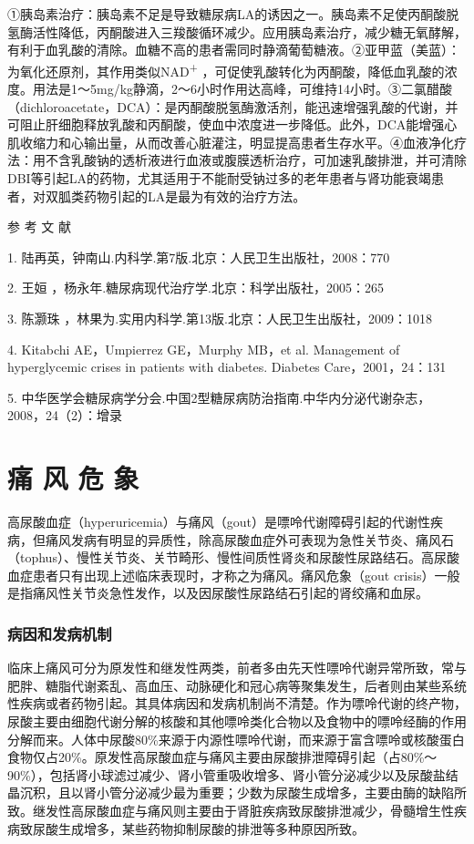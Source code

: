 ①胰岛素治疗：胰岛素不足是导致糖尿病LA的诱因之一。胰岛素不足使丙酮酸脱氢酶活性降低，丙酮酸进入三羧酸循环减少。应用胰岛素治疗，减少糖无氧酵解，有利于血乳酸的清除。血糖不高的患者需同时静滴葡萄糖液。②亚甲蓝（美蓝）：为氧化还原剂，其作用类似NAD\textsuperscript{+}
，可促使乳酸转化为丙酮酸，降低血乳酸的浓度。用法是1～5mg/kg静滴，2～6小时作用达高峰，可维持14小时。③二氯醋酸（dichloroacetate，DCA）：是丙酮酸脱氢酶激活剂，能迅速增强乳酸的代谢，并可阻止肝细胞释放乳酸和丙酮酸，使血中浓度进一步降低。此外，DCA能增强心肌收缩力和心输出量，从而改善心脏灌注，明显提高患者生存水平。④血液净化疗法：用不含乳酸钠的透析液进行血液或腹膜透析治疗，可加速乳酸排泄，并可清除DBI等引起LA的药物，尤其适用于不能耐受钠过多的老年患者与肾功能衰竭患者，对双胍类药物引起的LA是最为有效的治疗方法。
\protect\hypertarget{text00124.html}{}{}

\hypertarget{text00124.htmlux5cux23CHP4-14-4}{}
参 考 文 献

1. 陆再英，钟南山.内科学.第7版.北京：人民卫生出版社，2008：770

2. 王姮 ，杨永年.糖尿病现代治疗学.北京：科学出版社，2005：265

3. 陈灏珠 ，林果为.实用内科学.第13版.北京：人民卫生出版社，2009：1018

4. Kitabchi AE，Umpierrez GE，Murphy MB，et al. Management of
hyperglycemic crises in patients with diabetes. Diabetes
Care，2001，24：131

5.
中华医学会糖尿病学分会.中国2型糖尿病防治指南.中华内分泌代谢杂志，2008，24（2）：增录

\protect\hypertarget{text00125.html}{}{}

\chapter{痛 风 危 象}

高尿酸血症（hyperuricemia）与痛风（gout）是嘌呤代谢障碍引起的代谢性疾病，但痛风发病有明显的异质性，除高尿酸血症外可表现为急性关节炎、痛风石（tophus）、慢性关节炎、关节畸形、慢性间质性肾炎和尿酸性尿路结石。高尿酸血症患者只有出现上述临床表现时，才称之为痛风。痛风危象（gout
crisis）一般是指痛风性关节炎急性发作，以及因尿酸性尿路结石引起的肾绞痛和血尿。

\subsection{病因和发病机制}

临床上痛风可分为原发性和继发性两类，前者多由先天性嘌呤代谢异常所致，常与肥胖、糖脂代谢紊乱、高血压、动脉硬化和冠心病等聚集发生，后者则由某些系统性疾病或者药物引起。其具体病因和发病机制尚不清楚。作为嘌呤代谢的终产物，尿酸主要由细胞代谢分解的核酸和其他嘌呤类化合物以及食物中的嘌呤经酶的作用分解而来。人体中尿酸80\%来源于内源性嘌呤代谢，而来源于富含嘌呤或核酸蛋白食物仅占20\%。原发性高尿酸血症与痛风主要由尿酸排泄障碍引起（占80\%～90\%），包括肾小球滤过减少、肾小管重吸收增多、肾小管分泌减少以及尿酸盐结晶沉积，且以肾小管分泌减少最为重要；少数为尿酸生成增多，主要由酶的缺陷所致。继发性高尿酸血症与痛风则主要由于肾脏疾病致尿酸排泄减少，骨髓增生性疾病致尿酸生成增多，某些药物抑制尿酸的排泄等多种原因所致。

